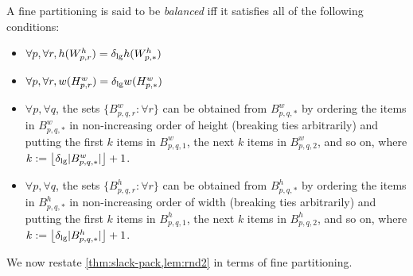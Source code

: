 \begin{definition}
\label{defn:bal-fine-part}
A fine partitioning is said to be \emph{balanced} iff it satisfies all of the following conditions:
\begin{itemize}
\item $\forall p, \forall r, h(W^h_{p,r}) = \delta_{\mathrm{lg}} h(W^h_{p,*})$
\item $\forall p, \forall r, w(H^w_{p,r}) = \delta_{\mathrm{lg}} w(H^w_{p,*})$
\item $\forall p, \forall q$, the sets $\{B^w_{p,q,r}: \forall r\}$ can be obtained from
    $B^w_{p,q,*}$ by ordering the items in $B^w_{p,q,*}$ in non-increasing order of
    height (breaking ties arbitrarily) and putting the first $k$ items in $B^w_{p,q,1}$,
    the next $k$ items in $B^w_{p,q,2}$, and so on,
    where $k := \left\lfloor \delta_{\mathrm{lg}}|B^w_{p,q,*}| \right\rfloor + 1$.
\item $\forall p, \forall q$, the sets $\{B^h_{p,q,r}: \forall r\}$ can be obtained from
    $B^h_{p,q,*}$ by ordering the items in $B^h_{p,q,*}$ in non-increasing order of
    width (breaking ties arbitrarily) and putting the first $k$ items in $B^h_{p,q,1}$,
    the next $k$ items in $B^h_{p,q,2}$, and so on,
    where $k := \left\lfloor \delta_{\mathrm{lg}}|B^h_{p,q,*}| \right\rfloor + 1$.
\end{itemize}
\end{definition}

We now restate \cref{thm:slack-pack,lem:rnd2} in terms of fine partitioning.

